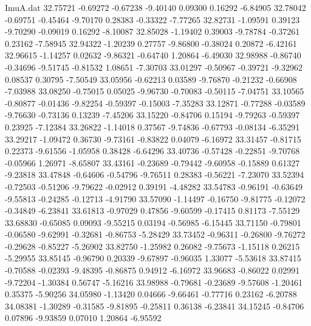 \begin{filecontents}{ImuA.dat}
  32.75721   -0.69272   -0.67238   -9.40140    0.09300    0.16292   -6.84905
  32.78042   -0.69751   -0.45464   -9.70170    0.28383   -0.33322   -7.77265
  32.82731   -1.09591    0.39123   -9.70290   -0.09019    0.16292   -8.10087
  32.85028   -1.19402    0.39003   -9.78784   -0.37261    0.23162   -7.58945
  32.94322   -1.20239    0.27757   -9.86800   -0.38024    0.20872   -6.42161
  32.96615   -1.14257    0.02632   -9.86321   -0.64740    1.20864   -6.49030
  32.98988   -0.86740   -0.34696   -9.51745   -0.81532    1.08651   -7.30703
  33.01297   -0.50967   -0.39721   -9.32962    0.08537    0.30795   -7.50549
  33.05956   -0.62213    0.03589   -9.76870   -0.21232   -0.66908   -7.03988
  33.08250   -0.75015    0.05025   -9.96730   -0.70083   -0.50115   -7.04751
  33.10565   -0.80877   -0.01436   -9.82254   -0.59397   -0.15003   -7.35283
  33.12871   -0.77288   -0.03589   -9.76630   -0.73136    0.13239   -7.45206
  33.15220   -0.84706    0.15194   -9.79263   -0.59397    0.23925   -7.12384
  33.26822   -1.14018    0.37567   -9.74836   -0.67793   -0.08134   -6.35291
  33.29217   -1.09472    0.36730   -9.73161   -0.83822    0.04079   -6.16972
  33.31457   -0.81715    0.22373   -9.61556   -1.05958    0.38428   -6.64296
  33.40736   -0.57428   -0.22851   -9.70768   -0.05966    1.26971   -8.65807
  33.43161   -0.23689   -0.79442   -9.60958   -0.15889    0.61327   -9.23818
  33.47848   -0.64606   -0.54796   -9.76511    0.28383   -0.56221   -7.23070
  33.52394   -0.72503   -0.51206   -9.79622   -0.02912    0.39191   -4.48282
  33.54783   -0.96191   -0.63649   -9.55813   -0.24285   -0.12713   -4.91790
  33.57090   -1.14497   -0.16750   -9.81775   -0.12072   -0.34849   -6.23841
  33.61813   -0.97029    0.47856   -9.60599   -0.17415    0.81173   -7.55129
  33.68830   -0.65085    0.09093   -9.55215    0.03194   -0.56985   -6.15445
  33.71150   -0.79801   -0.06580   -9.62991   -0.32681   -0.86753   -5.28429
  33.73452   -0.96311   -0.26800   -9.76272   -0.29628   -0.85227   -5.26902
  33.82750   -1.25982    0.26082   -9.75673   -1.15118    0.26215   -5.29955
  33.85145   -0.96790    0.20339   -9.67897   -0.96035    1.33077   -5.53618
  33.87415   -0.70588   -0.02393   -9.48395   -0.86875    0.94912   -6.16972
  33.96683   -0.86022    0.02991   -9.72204   -1.30384    0.56747   -5.16216
  33.98988   -0.79681   -0.23689   -9.57608   -1.20461    0.35375   -5.90256
  34.05980   -1.13420    0.04666   -9.66461   -0.77716    0.23162   -6.20788
  34.08381   -1.30289   -0.31585   -9.81895   -0.25811    0.36138   -6.23841
  34.15245   -0.84706    0.07896   -9.93859    0.07010    1.20864   -6.95592

\end{filecontents}
